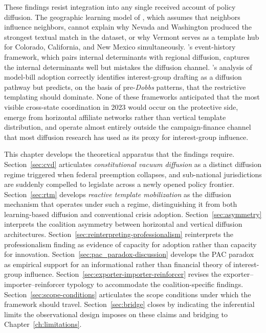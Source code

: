 These findings resist integration into any single received account of policy diffusion. The geographic learning model of \textcite{walkerDiffusionInnovationsAmerican1969}, which assumes that neighbors influence neighbors, cannot explain why Nevada and Washington produced the strongest textual match in the dataset, or why Vermont serves as a template hub for Colorado, California, and New Mexico simultaneously. \textcite{berryStateLotteryAdoptions1990}'s event-history framework, which pairs internal determinants with regional diffusion, captures the internal determinants well but mistakes the diffusion channel. \textcite{jansaCopyPasteLawmaking2019}'s analysis of model-bill adoption correctly identifies interest-group drafting as a diffusion pathway but predicts, on the basis of pre-\textit{Dobbs} patterns, that the restrictive templating should dominate. None of these frameworks anticipated that the most visible cross-state coordination in 2023 would occur on the protective side, emerge from horizontal affiliate networks rather than vertical template distribution, and operate almost entirely outside the campaign-finance channel that most diffusion research has used as its proxy for interest-group influence.

This chapter develops the theoretical apparatus that the findings require. Section~\ref{sec:cvd} articulates \emph{constitutional vacuum diffusion} as a distinct diffusion regime triggered when federal preemption collapses, and sub-national jurisdictions are suddenly compelled to legislate across a newly opened policy frontier. Section~\ref{sec:rtm} develops \emph{reactive template mobilization} as the diffusion mechanism that operates under such a regime, distinguishing it from both learning-based diffusion and conventional crisis adoption. Section~\ref{sec:asymmetry} interprets the coalition asymmetry between horizontal and vertical diffusion architectures. Section~\ref{sec:reinterpreting-professionalism} reinterprets the professionalism finding as evidence of capacity for adoption rather than capacity for innovation. Section~\ref{sec:pac_paradox-discussion} develops the PAC paradox as empirical support for an informational rather than financial theory of interest-group influence. Section~\ref{sec:exporter-importer-reinforcer} revises the exporter--importer--reinforcer typology to accommodate the coalition-specific findings. Section~\ref{sec:scope-conditions} articulates the scope conditions under which the framework should travel. Section~\ref{sec:bridge} closes by indicating the inferential limits the observational design imposes on these claims and bridging to Chapter~\ref{ch:limitations}.


